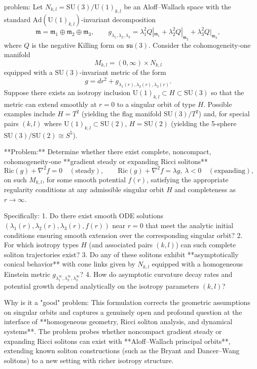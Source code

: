 problem:  
Let \(N_{k,l} = \mathrm{SU}(3)/\mathrm{U}(1)_{k,l}\) be an Aloff–Wallach space with the standard \(\mathrm{Ad}(\mathrm{U}(1)_{k,l})\)-invariant decomposition  
\[
\mathfrak{m} = \mathfrak{m}_1 \oplus \mathfrak{m}_2 \oplus \mathfrak{m}_3,\qquad 
g_{\lambda_1,\lambda_2,\lambda_3} = \lambda_1^2 Q|_{\mathfrak{m}_1} + \lambda_2^2 Q|_{\mathfrak{m}_2} + \lambda_3^2 Q|_{\mathfrak{m}_3},
\]
where \(Q\) is the negative Killing form on \(\mathfrak{su}(3)\).  
Consider the cohomogeneity‑one manifold
\[
M_{k,l} = (0,\infty) \times N_{k,l}
\]
equipped with a \(\mathrm{SU}(3)\)-invariant metric of the form
\[
g = dr^2 + g_{\lambda_1(r),\lambda_2(r),\lambda_3(r)}.
\]
Suppose there exists an isotropy inclusion \( \mathrm{U}(1)_{k,l} \subset H \subset \mathrm{SU}(3)\) so that the metric can extend smoothly at \(r=0\) to a singular orbit of type \(H\).  
Possible examples include \(H = T^2\) (yielding the flag manifold \(\mathrm{SU}(3)/T^2\)) and, for special pairs \((k,l)\) where \(\mathrm{U}(1)_{k,l} \subset \mathrm{SU}(2)\), \(H = \mathrm{SU}(2)\) (yielding the 5-sphere \(\mathrm{SU}(3)/\mathrm{SU}(2) \cong S^5\)).

**Problem:**  
Determine whether there exist complete, noncompact, cohomogeneity‑one **gradient steady or expanding Ricci solitons**
\[
\mathrm{Ric}(g) + \nabla^2 f = 0 \quad (\text{steady}), \qquad
\mathrm{Ric}(g) + \nabla^2 f = \lambda g,\ \lambda < 0 \quad (\text{expanding}),
\]
on such \(M_{k,l}\), for some smooth potential \(f(r)\), satisfying the appropriate regularity conditions at any admissible singular orbit \(H\) and completeness as \(r\to\infty\).

Specifically:
1. Do there exist smooth ODE solutions \((\lambda_1(r),\lambda_2(r),\lambda_3(r),f(r))\) near \(r=0\) that meet the analytic initial conditions ensuring smooth extension over the corresponding singular orbit?  
2. For which isotropy types \(H\) (and associated pairs \((k,l)\)) can such complete soliton trajectories exist?  
3. Do any of these solitons exhibit **asymptotically conical behavior** with cone links given by \(N_{k,l}\) equipped with a homogeneous Einstein metric \(g_{\lambda_1^\infty,\lambda_2^\infty,\lambda_3^\infty}\)?  
4. How do asymptotic curvature decay rates and potential growth depend analytically on the isotropy parameters \((k,l)\)?  

Why is it a "good" problem:  
This formulation corrects the geometric assumptions on singular orbits and captures a genuinely open and profound question at the interface of **homogeneous geometry, Ricci soliton analysis, and dynamical systems**.  
The problem probes whether noncompact gradient steady or expanding Ricci solitons can exist with **Aloff–Wallach principal orbits**, extending known soliton constructions (such as the Bryant and Dancer–Wang solitons) to a new setting with richer isotropy structure.  

